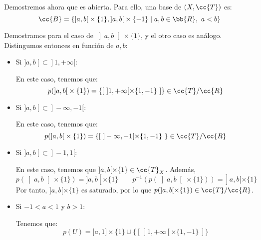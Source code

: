 \documentclass[12pt]{article}
\newcommand{\T}[0]{\cc{T}}
\begin{document}
\begin{ejercicio}[2.5 puntos]
\begin{enumerate}
            Demostremos ahora que es abierta. Para ello, una base de
            $(X,\T)$ es:
            \begin{equation*}
              \cc{B} = \left\{
                \left]a,b\right[\times \{1\}, \left]a,b\right[\times \{-1\}
                \mid
                a,b\in \bb{R},~a<b
              \right\}
            \end{equation*}

            Demostramos para el caso de $\left]a,b\right[\times \{1\}$, y el otro caso es análogo.            
            Distingumos entonces en función de $a,b$:
            \begin{itemize}
              \item Si $]a,b[ \subset ]1, +\infty[$:
              
              En este caso, tenemos que:
              \begin{equation*}
                p(\left]a,b\right[\times \{1\}) = \{[~]1, +\infty[ \times \{1,-1\}~]\} \in \T/\cc{R}
              \end{equation*}

              \item Si $]a,b[ \subset ]-\infty, -1[$:
              
              En este caso, tenemos que:
              \begin{equation*}
                p(\left]a,b\right[\times \{1\}) = \{[~]-\infty, -1[ \times \{1,-1\}~\} \in \T/\cc{R}
              \end{equation*}

              \item Si $]a,b[ \subset ]-1,1[$:
              
              En este caso, tenemos que $]a,b[\times \{1\}\in \T_X$. Además,
              \begin{equation*}
                p(\left]a,b\right[\times \{1\}) = ]a,b[ \times \{1\}
                \qquad
                p^{-1}(p(\left]a,b\right[\times \{1\})) = ]a,b[ \times \{1\}
              \end{equation*}
              Por tanto, $]a,b[\times \{1\}$ es saturado, por lo que
              $p(]a,b[\times \{1\})\in \T/\cc{R}$.

              \item Si $-1<a<1$ y $b>1$:
              
              Tenemos que:
              \begin{equation*}
                p(U) = ]a, 1] \times \{1\} \cup \{[~]1, +\infty[ \times \{1,-1\}~]\}
              \end{equation*}
              

\end{itemize}
\end{enumerate}
\end{ejercicio}
\end{document}
